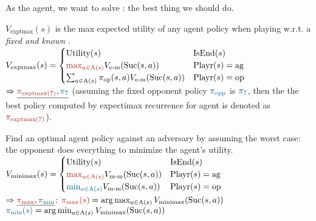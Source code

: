 As the agent, we want to solve : the best
thing we should do.

 $V_{\text{exptmax}}(s)$ is the max expected utility of any
agent policy when playing w.r.t. a \emph{fixed and known}
.
$V_{\text{exptmax}}(s) = \begin{cases}
    \text{Utility}(s) & \text{IsEnd}(s) \\
    \agentcolor{\max_{a \in \text{A}(s)}} V_{\text{e-m}}(\text{Suc}(s, a)) & \text{Playr}(s) = \text{ag} \\
    \sum_{a \in \text{A}(s)} \pi_{\text{op}}(s, a) V_{\text{e-m}}(\text{Suc}(s, a)) & \text{Playr}(s) = \text{op} \\
\end{cases}$ \\
$\Rightarrow \underline{\agentcolor{\pi_{\text{exptmax}(7)}},
\oppcolor{\pi_{\text{7}}}}$ (assuming the fixed opponent policy
$\oppcolor{\pi_{\text{opp}}}$ is $\oppcolor{\pi_{\text{7}}}$, then the the best
policy computed by expectimax recurrence for agent is denoted as
$\agentcolor{\pi_{\text{exptmax}(7)}}$).

 Find an optimal agent policy against an adversary by assuming the
worst case: the opponent does everything to minimize the agent's utility.
$V_{\text{minimax}}(s) = \begin{cases}
    \text{Utility}(s) & \text{IsEnd}(s) \\
    \agentcolor{\max_{a \in \text{A}(s)}} V_{\text{m-m}}(\text{Suc}(s, a)) & \text{Playr}(s) = \text{ag} \\
    \oppcolor{\min_{a \in \text{A}(s)}} V_{\text{m-m}}(\text{Suc}(s, a)) & \text{Playr}(s) = \text{op} \\
\end{cases}$\\
$\Rightarrow \underline{\agentcolor{\pi_{\text{max}}}, \oppcolor{\pi_{\text{min}}}}$:
$\agentcolor{\pi_{\text{max}}(s)} = \arg \max_{a \in \text{A}(s)} V_{\text{minimax}}(\text{Suc}(s, a))$\\
$\oppcolor{\pi_{\text{min}}(s)} = \arg \min_{a \in \text{A}(s)} V_{\text{minimax}}(\text{Suc}(s, a))$\\

